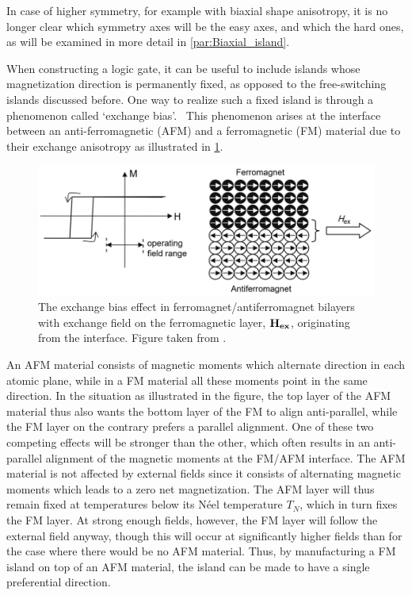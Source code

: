 \documentclass[11pt,a4paper,english]{article}
\begin{document}
In case of higher symmetry, for example with biaxial shape anisotropy, it is no longer clear which symmetry axes will be the easy axes, and which the hard ones, as will be examined in more detail in \cref{par:Biaxial_island}.  \par
When constructing a logic gate, it can be useful to include islands whose magnetization direction is permanently fixed, as opposed to the free-switching islands discussed before. One way to realize such a fixed island is through a phenomenon called `exchange bias'.~\cite{ExchangeBias_Mechanisms,ExchangeBias_nanostructures,ExchangeBias,syllabus_PoAEaPD} This phenomenon arises at the interface between an anti-ferromagnetic (AFM) and a ferromagnetic (FM) material due to their exchange anisotropy as illustrated in \cref{fig:Intro_ExchangeBias}.
\begin{figure}[t]
    \centering
    \includegraphics[width=0.8\columnwidth]{Figures/Introduction/Syallabus_PoAEaPD - Figure 2.7.png}
    \caption{The exchange bias effect in ferromagnet/antiferromagnet bilayers with exchange field on the ferromagnetic layer, $\vb{H_{ex}}$, originating from the interface. Figure taken from \cite{syllabus_PoAEaPD}.}
    \label{fig:Intro_ExchangeBias}
\end{figure}
An AFM material consists of magnetic moments which alternate direction in each atomic plane, while in a FM material all these moments point in the same direction. In the situation as illustrated in the figure, the top layer of the AFM material thus also wants the bottom layer of the FM to align anti-parallel, while the FM layer on the contrary prefers a parallel alignment. One of these two competing effects will be stronger than the other, which often results in an anti-parallel alignment of the magnetic moments at the FM/AFM interface. The AFM material is not affected by external fields since it consists of alternating magnetic moments which leads to a zero net magnetization. The AFM layer will thus remain fixed at temperatures below its N\'{e}el temperature $T_N$, which in turn fixes the FM layer. At strong enough fields, however, the FM layer will follow the external field anyway, though this will occur at significantly higher fields than for the case where there would be no AFM material. Thus, by manufacturing a FM island on top of an AFM material, the island can be made to have a single preferential direction. \par
\end{document}
